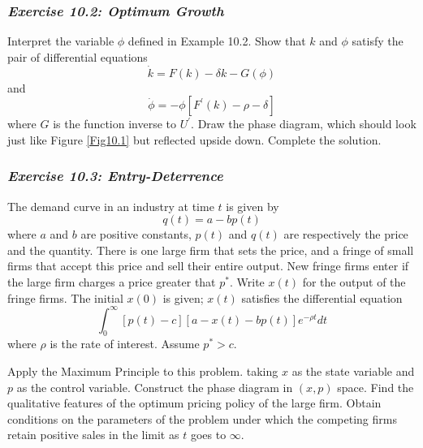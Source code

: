 \subsubsection*{\textit{Exercise 10.2: Optimum Growth}}

Interpret the variable $\phi$ defined in Example 10.2. Show that $k$ and $\phi$ satisfy the pair of differential equations
\begin{equation*}
\dot{k} = F(k) - \delta k - G(\phi)
\end{equation*} 
and 
\begin{equation*}
\dot{\phi} = -\phi [F^\prime(k) -\rho - \delta ]
\end{equation*} 
where $G$ is the function inverse to $U^\prime$. Draw the phase diagram, which should look just like Figure \ref{Fig10.1} but reflected upside down. Complete the solution.

\subsubsection*{\textit{Exercise 10.3: Entry-Deterrence}}

The demand curve in an industry at time $t$ is given by
\begin{equation*}
 q(t) = a - b p(t)
\end{equation*}
where $a$ and $b$ are positive constants, $p(t)$ and $q(t)$ are respectively the price and the quantity. There is one large firm that sets the price, and a fringe of small firms that accept this price and sell their entire output. New fringe firms enter if the large firm charges a price greater that $p^*$. Write $x(t)$ for the output of the fringe firms. The initial $x(0)$ is given; $x(t)$ satisfies the differential equation
\begin{equation*}
 \int_0^\infty [p(t) - c][a - x(t) - b p(t)] e^{-\rho t} dt
\end{equation*}
where $\rho$ is the rate of interest. Assume $p^* > c$.

Apply the Maximum Principle to this problem. taking $x$ as the state variable and $p$ as the control variable. Construct the phase diagram in $(x,p)$ space. Find the qualitative features of the optimum pricing policy of the large firm. Obtain conditions on the parameters of the problem under which the competing firms retain positive sales in the limit as $t$ goes to $\infty$.







